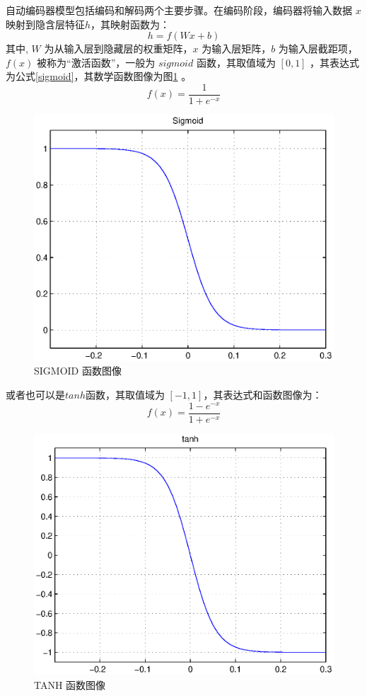 \documentclass[oneside]{ZJUthesis}
\begin{document}
自动编码器模型包括编码和解码两个主要步骤。在编码阶段，编码器将输入数据 $x$ 映射到隐含层特征$h$，其映射函数为：
\begin{equation}
	h=f(Wx+b)
\end{equation}
其中, $W$ 为从输入层到隐藏层的权重矩阵，$x$ 为输入层矩阵，$b$ 为输入层截距项，$f(x)$ 被称为``激活函数''，一般为 $sigmoid$ 函数，其取值域为 $[0,1]$ ，其表达式为公式\ref{sigmoid}，其数学函数图像为图\ref{fig:sigmoid}	。
\begin{equation}
	\label{sigmoid}
	f(x)=\frac{1}{1+e^{-x}}
\end{equation}
\begin{figure}[H]
\centering
\includegraphics[scale=0.6]{./Pictures/sigmoid.eps}
\caption{SIGMOID 函数图像\label{fig:sigmoid}}
\end{figure}

或者也可以是$tanh$函数，其取值域为 $[-1,1]$，其表达式和函数图像为：
\begin{equation}
	f(x)=\frac{1-e^{-x}}{1+e^{-x}}
\end{equation}
\begin{figure}[H]
\centering
\includegraphics[scale=0.6]{./Pictures/tanh.eps}
\caption{TANH 函数图像\label{fig:tanh}}
\end{figure}
\end{document}
